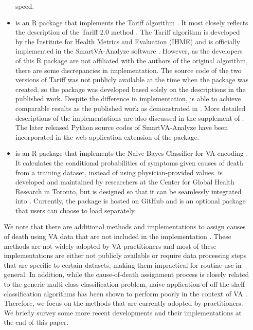 \begin{itemize}
  speed.
\item
   \citep{tariffpkg} is an R package that implements the
  Tariff algorithm \citep{james}. It most closely reflects the
  description of the Tariff 2.0 method \citep{serina2015improving}. The
  Tariff algorithm is developed by the Institute for Health Metrics and
  Evaluation (IHME) and is officially implemented in the SmartVA-Analyze
  software \citep{smartVA-web}. However, as the developers of this R
  package are not affiliated with the authors of the original algorithm,
  there are some discrepancies in implementation. The source code of the
  two versions of Tariff was not publicly available at the time when the
   package was created, so the package was developed
  based solely on the descriptions in the published work. Despite the
  difference in implementation,  is able to achieve
  comparable results as the published work as demonstrated in
  \citet{insilico}. More detailed descriptions of the 
  implementations are also discussed in the supplement of
  \citet{insilico}. The later released Python source codes of
  SmartVA-Analyze have been incorporated in the web application
  extension of the  package.
\item
   \citep{nbcpkg} is an R package that implements the Naive
  Bayes Classifier for VA encoding \citep{miasnikof2015naive}. It
  calculates the conditional probabilities of symptoms given causes of
  death from a training dataset, instead of using physician-provided
  values.  is developed and maintained by researchers at the
  Center for Global Health Research in Toronto, but is designed so that
  it can be seamlessly integrated into . Currently, the
   package is hosted on GitHub and is an optional package
  that users can choose to load separately.
\end{itemize}

We note that there are additional methods and implementations to assign
causes of death using VA data that are not included in the
 implementation
\citep[e.g.,][]{flaxman2011random, jeblee2019automatically}. These
methods are not widely adopted by VA practitioners and most of these
implementations are either not publicly available or require data
processing steps that are specific to certain datasets, making them
impractical for routine use in general. In addition, while the
cause-of-death assignment process is closely related to the generic
multi-class classification problem, naive application of off-the-shelf
classification algorithms has been shown to perform poorly in the
context of VA \citep{murray2014using}. Therefore, we focus on the
methods that are currently adopted by practitioners. We briefly survey
some more recent developments and their implementations at the end of
this paper.

